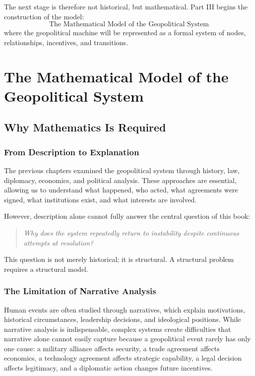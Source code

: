 \documentclass[11pt,openany]{book}
\theoremstyle{plain}
\theoremstyle{definition}
\begin{document}
The next stage is therefore not historical, but mathematical. Part III begins the construction of the model:
\[
\boxed{
\text{The Mathematical Model of the Geopolitical System}
}
\]
where the geopolitical machine will be represented as a formal system of nodes, relationships, incentives, and transitions.


\part{The Mathematical Model of the Geopolitical System}


\chapter{Why Mathematics Is Required}

\section*{From Description to Explanation}

The previous chapters examined the geopolitical system through history, law, diplomacy, economics, and political analysis. These approaches are essential, allowing us to understand what happened, who acted, what agreements were signed, what institutions exist, and what interests are involved.

However, description alone cannot fully answer the central question of this book:
\begin{quote}
\textit{Why does the system repeatedly return to instability despite continuous attempts at resolution?}
\end{quote}

This question is not merely historical; it is structural. A structural problem requires a structural model.

\section*{The Limitation of Narrative Analysis}

Human events are often studied through narratives, which explain motivations, historical circumstances, leadership decisions, and ideological positions. While narrative analysis is indispensable, complex systems create difficulties that narrative alone cannot easily capture because a geopolitical event rarely has only one cause: a military alliance affects security, a trade agreement affects economics, a technology agreement affects strategic capability, a legal decision affects legitimacy, and a diplomatic action changes future incentives.
\end{document}
